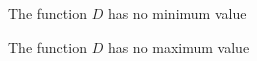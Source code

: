 \documentclass{ximera}
\begin{document}
\begin{example}
\begin{question}
The function $D$ has no minimum value
\begin{multipleChoice}
\end{multipleChoice}
\end{question}


\begin{question}
The function $D$ has no maximum value
\begin{multipleChoice}
\end{multipleChoice}
\end{question}




\end{example}
\end{document}

